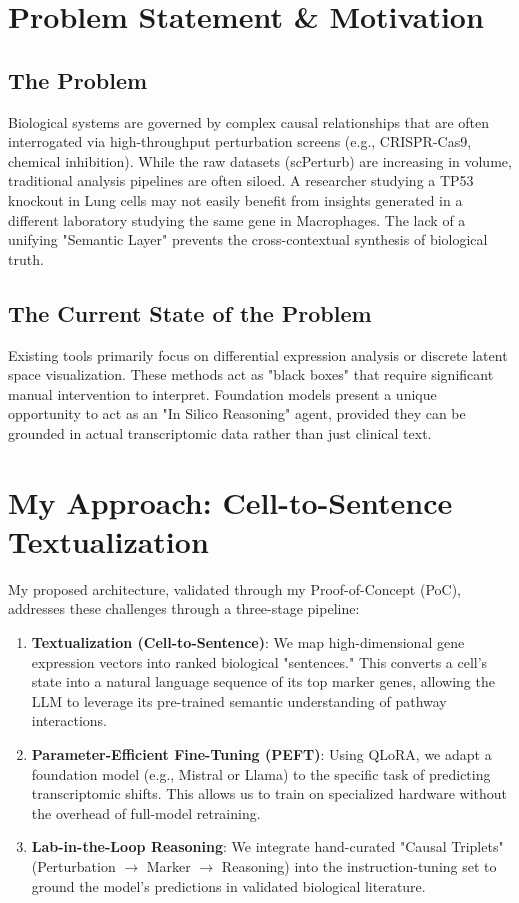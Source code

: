\documentclass[12pt,a4paper]{article}
\begin{document}
\section{Problem Statement \& Motivation}
\subsection{The Problem}
Biological systems are governed by complex causal relationships that are often interrogated via high-throughput perturbation screens (e.g., CRISPR-Cas9, chemical inhibition). While the raw datasets (scPerturb) are increasing in volume, traditional analysis pipelines are often siloed. A researcher studying a TP53 knockout in Lung cells may not easily benefit from insights generated in a different laboratory studying the same gene in Macrophages. The lack of a unifying "Semantic Layer" prevents the cross-contextual synthesis of biological truth.

\subsection{The Current State of the Problem}
Existing tools primarily focus on differential expression analysis or discrete latent space visualization. These methods act as "black boxes" that require significant manual intervention to interpret. Foundation models present a unique opportunity to act as an "In Silico Reasoning" agent, provided they can be grounded in actual transcriptomic data rather than just clinical text.

\section{My Approach: Cell-to-Sentence Textualization}
My proposed architecture, validated through my Proof-of-Concept (PoC), addresses these challenges through a three-stage pipeline:

\begin{enumerate}
    \item \textbf{Textualization (Cell-to-Sentence)}: We map high-dimensional gene expression vectors into ranked biological "sentences." This converts a cell's state into a natural language sequence of its top marker genes, allowing the LLM to leverage its pre-trained semantic understanding of pathway interactions.
    \item \textbf{Parameter-Efficient Fine-Tuning (PEFT)}: Using QLoRA, we adapt a foundation model (e.g., Mistral or Llama) to the specific task of predicting transcriptomic shifts. This allows us to train on specialized hardware without the overhead of full-model retraining.
    \item \textbf{Lab-in-the-Loop Reasoning}: We integrate hand-curated "Causal Triplets" (Perturbation $\rightarrow$ Marker $\rightarrow$ Reasoning) into the instruction-tuning set to ground the model's predictions in validated biological literature.
\end{enumerate}
\end{document}
